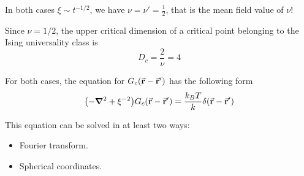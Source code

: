 \documentclass[../main/main.tex]{subfiles}
\begin{document}
\begin{remark}
In both cases \( \xi \sim t^{-1/2} \), we have \( \nu = \nu ' = \frac{1}{2} \), that is the mean field value of \( \nu  \)!
\end{remark}
\begin{remark}
Since \( \nu = 1/2 \), the upper critical dimension of a critical point belonging to the Ising universality class is
\begin{equation}
  D_c = \frac{2}{\nu } = 4
\end{equation}
\end{remark}
For both cases, the equation for \( G_c (\va{r}-\va{r}') \) has the following form
\begin{equation}
  \qty(- \grad ^2 + \xi ^{-2}) G_c (\va{r}-\va{r}') = \frac{k_B T}{k} \delta (\va{r}-\va{r}')
\end{equation}

This equation can be solved in at least two ways:
\begin{itemize}
\item Fourier transform.
\item Spherical coordinates.
\end{itemize}
\end{document}
